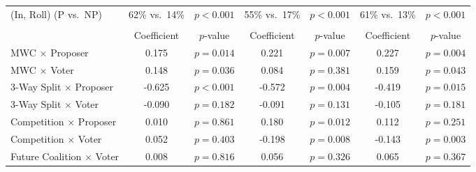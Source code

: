 \begin{table}[ht]
\begin{threeparttable}
{\begin{tabular}{l@{\hskip 24pt} c@{\hskip 10pt}c @{\hskip 24pt} c@{\hskip 10pt}c @{\hskip 24pt} c@{\hskip 10pt}c}
(In, Roll) (P vs.\ NP) & \multicolumn{1}{c}{62\% vs.\ 14\%} & \multicolumn{1}{c}{\(p{<}0.001\)} & \multicolumn{1}{c}{55\% vs.\ 17\%} & \multicolumn{1}{c}{\(p{<}0.001\)} & \multicolumn{1}{c}{61\% vs.\ 13\%} & \multicolumn{1}{c}{\(p{<}0.001\)} \\
\addlinespace[10pt]
\midrule
\addlinespace[4pt]
\multicolumn{7}{l}{\textit{Panel C: Timing (\cite{BH_JEP_2023})}} \\
\addlinespace[4pt]
 & \multicolumn{1}{c}{Coefficient} & \multicolumn{1}{c}{\(p\)-value} & \multicolumn{1}{c}{Coefficient} & \multicolumn{1}{c}{\(p\)-value} & \multicolumn{1}{c}{Coefficient} & \multicolumn{1}{c}{\(p\)-value} \\
\cmidrule(r){1-1} \cmidrule(l{2pt}r{2pt}){2-3} \cmidrule(l{2pt}r{2pt}){4-5} \cmidrule(l){6-7}
\addlinespace[3pt]
MWC \(\times\) Proposer & \multicolumn{1}{c}{0.175} & \multicolumn{1}{c}{\(p=0.014\)} & \multicolumn{1}{c}{0.221} & \multicolumn{1}{c}{\(p=0.007\)} & \multicolumn{1}{c}{0.227} & \multicolumn{1}{c}{\(p=0.004\)} \\
MWC \(\times\) Voter & \multicolumn{1}{c}{0.148} & \multicolumn{1}{c}{\(p=0.036\)} & \multicolumn{1}{c}{0.084} & \multicolumn{1}{c}{\(p=0.381\)} & \multicolumn{1}{c}{0.159} & \multicolumn{1}{c}{\(p=0.043\)} \\
3-Way Split \(\times\) Proposer & \multicolumn{1}{c}{-0.625} & \multicolumn{1}{c}{\(p{<}0.001\)} & \multicolumn{1}{c}{-0.572} & \multicolumn{1}{c}{\(p=0.004\)} & \multicolumn{1}{c}{-0.419} & \multicolumn{1}{c}{\(p=0.015\)} \\
3-Way Split \(\times\) Voter & \multicolumn{1}{c}{-0.090} & \multicolumn{1}{c}{\(p=0.182\)} & \multicolumn{1}{c}{-0.091} & \multicolumn{1}{c}{\(p=0.131\)} & \multicolumn{1}{c}{-0.105} & \multicolumn{1}{c}{\(p=0.181\)} \\
Competition \(\times\) Proposer & \multicolumn{1}{c}{0.010} & \multicolumn{1}{c}{\(p=0.861\)} & \multicolumn{1}{c}{0.180} & \multicolumn{1}{c}{\(p=0.012\)} & \multicolumn{1}{c}{0.112} & \multicolumn{1}{c}{\(p=0.251\)} \\
Competition \(\times\) Voter & \multicolumn{1}{c}{0.052} & \multicolumn{1}{c}{\(p=0.403\)} & \multicolumn{1}{c}{-0.198} & \multicolumn{1}{c}{\(p=0.008\)} & \multicolumn{1}{c}{-0.143} & \multicolumn{1}{c}{\(p=0.003\)} \\
Future Coalition \(\times\) Voter & \multicolumn{1}{c}{0.008} & \multicolumn{1}{c}{\(p=0.816\)} & \multicolumn{1}{c}{0.056} & \multicolumn{1}{c}{\(p=0.326\)} & \multicolumn{1}{c}{0.065} & \multicolumn{1}{c}{\(p=0.367\)} \\

\end{tabular}}
\end{threeparttable}
\end{table}
